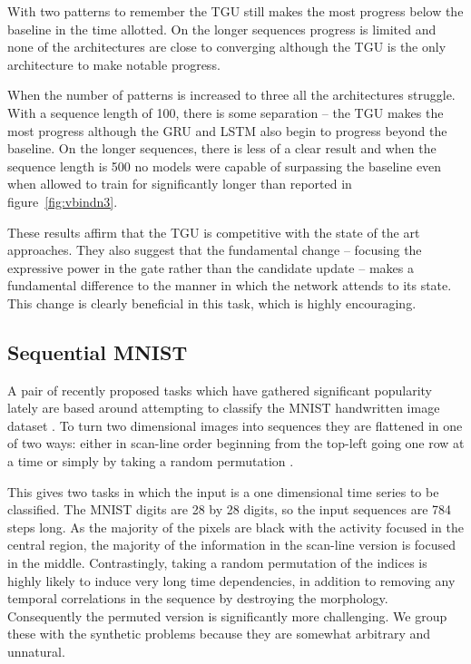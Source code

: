 With two patterns to remember the TGU still makes the most progress 
below the baseline in the time allotted.
On the longer sequences progress is limited and none of the architectures
are close to converging although the TGU is the only architecture to
make notable progress.

When the number of patterns is increased to three all the architectures struggle.
With a sequence length of 100, there is some separation -- the TGU makes the most
progress although the GRU and LSTM also begin to progress beyond the baseline.
On the longer sequences, there is less of a clear result and when the sequence
length is 500 no models were capable of surpassing the baseline even when
allowed to train for significantly longer than reported in figure~\ref{fig:vbindn3}.

These results affirm that the TGU is competitive with the state of the art approaches.
They also suggest that the fundamental change -- focusing the expressive power in the
gate rather than the candidate update -- makes a fundamental
difference to the manner in which the network attends to its state. This change is clearly
beneficial in this task, which is highly encouraging.


\subsection{Sequential MNIST}
A pair of recently proposed tasks which have gathered significant popularity lately
are based around attempting to classify the MNIST handwritten image dataset 
\autocite{Lecun1998}. To turn two dimensional images into sequences they are
flattened in one of two ways: either in scan-line order beginning from the top-left
going one row at a time or simply by taking a random permutation \autocite{Le2015}.

This gives two tasks in which the input is a one dimensional time series to be
classified. The MNIST digits are 28 by 28 digits, so the input sequences are
784 steps long. As the majority of the pixels are black with the activity focused
in the central region, the majority of the information in the scan-line version
is focused in the middle. Contrastingly, taking a random permutation of the indices
is highly likely to induce very long time dependencies, in addition to removing
any temporal correlations in the sequence by destroying the morphology. Consequently
the permuted version is significantly more challenging. We group these with the
synthetic problems because they are somewhat arbitrary and unnatural.

